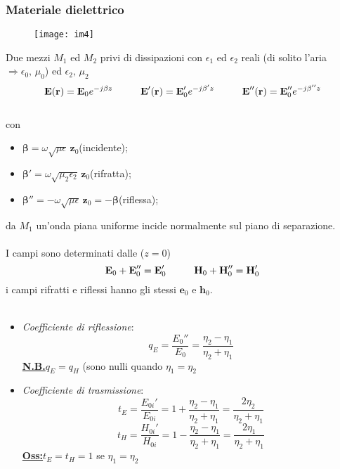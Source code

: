 \documentclass[a4paper]{article}
\begin{document}
\subsubsection*{Materiale dielettrico}
\begin{figure}[ht] 
\centering
\texttt{[image: im4]}
\end{figure}
Due mezzi $M_1$ ed $M_2$ privi di dissipazioni con $\epsilon_1$ ed $\epsilon_2$ reali (di solito l'aria $\Rightarrow\epsilon_0,\,\mu_0$) ed $\epsilon_2,\,\mu_2$
\begin{equation*}
\textbf{E}(\textbf{r})=\textbf{E}_0e^{-j\beta z}\hspace{10mm}\textbf{E}'(\textbf{r})=\textbf{E}_0'e^{-j\beta'z}\hspace{10mm}\textbf{E}''(\textbf{r})=\textbf{E}_0''e^{-j\beta''z}
\end{equation*}
\\con
\begin{itemize}
\item $\bm{\beta}=\omega\sqrt{\mu\epsilon}\,\textbf{z}_0$\hspace{29mm}(incidente);
\item $\bm{\beta}'=\omega\sqrt{\mu_2\epsilon_2}\,\textbf{z}_0$\hspace{25mm}(rifratta);
\item $\bm{\beta}''=-\omega\sqrt{\mu\epsilon}\,\textbf{z}_0=-\bm{\beta}$\hspace{15mm}(riflessa);
\end{itemize}
da $M_1$ un'onda piana uniforme incide normalmente sul piano di separazione.\\\\
I campi sono determinati dalle ($z=0$)
\begin{equation*}
\textbf{E}_0+\textbf{E}_0''=\textbf{E}_0'\hspace{10mm}\textbf{H}_0+\textbf{H}_0''=\textbf{H}_0'
\end{equation*}
i campi rifratti e riflessi hanno gli stessi $\textbf{e}_0$ e $\textbf{h}_0$.\\\\
\begin{itemize}
\item \emph{Coefficiente di riflessione}:
\begin{equation*}
q_E=\frac{E_0''}{E_0}=\frac{\eta_2-\eta_1}{\eta_2+\eta_1}
\end{equation*}
\underline{\textbf{N.B.}}\hspace{5mm}$q_E=q_H$ (sono nulli quando $\eta_1=\eta_2$
\item \emph{Coefficiente di trasmissione}:
\begin{equation*}
t_E=\frac{E_{0i}'}{E_{0i}}=1+\frac{\eta_2-\eta_1}{\eta_2+\eta_1}=\frac{2\eta_2}{\eta_2+\eta_1}
\end{equation*}
\begin{equation*}
t_H=\frac{H_{0i}'}{H_{0i}}=1-\frac{\eta_2-\eta_1}{\eta_2+\eta_1}=\frac{2\eta_1}{\eta_2+\eta_1}
\end{equation*}
\underline{\textbf{Oss:}}\hspace{5mm}$t_E=t_H=1$ se $\eta_1=\eta_2$
\end{itemize}
\end{document}
